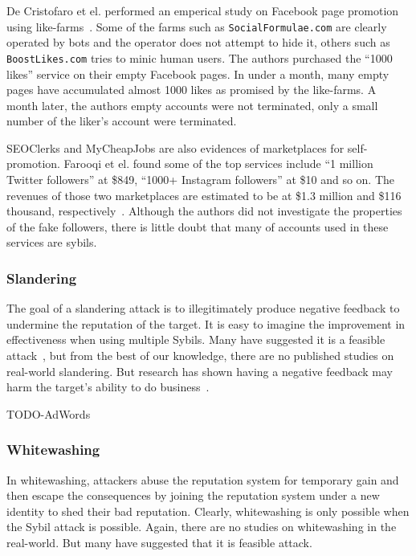 De Cristofaro et el. performed an emperical study on Facebook page promotion
using like-farms~\cite{de2014paying}. Some of the farms such as
\verb!SocialFormulae.com! are clearly operated by bots and the operator does not
attempt to hide it, others such as \verb!BoostLikes.com! tries to minic human
users. The authors purchased the ``1000 likes'' service on their empty Facebook
pages. In under a month, many empty pages have accumulated almost 1000 likes as
promised by the like-farms. A month later, the authors empty accounts were not
terminated, only a small number of the liker's account were terminated.


SEOClerks and MyCheapJobs are also evidences of marketplaces for self-promotion.
Farooqi et el. found some of the top services include ``1 million Twitter
followers'' at \$849, ``1000+ Instagram followers'' at \$10 and so on. The
revenues of those two marketplaces are estimated to be at \$1.3 million and
\$116 thousand, respectively~\cite{farooqi2015characterizing}. Although the
authors did not investigate the properties of the fake followers, there is
little doubt that many of accounts used in these services are sybils.

\subsubsection{Slandering}
The goal of a slandering attack is to illegitimately produce negative feedback
to undermine the reputation of the target. It is easy to imagine the improvement
in effectiveness when using multiple Sybils. Many have suggested it is a
feasible attack~\cite{hoffman2009survey, koutrouli2012taxonomy}, but from the
best of our knowledge, there are no published studies on real-world slandering.
But research has shown having a negative feedback may harm the target's ability
to do business~\cite{ba2002evidence}.

TODO-AdWords

\subsubsection{Whitewashing}
In whitewashing, attackers abuse the reputation system for temporary gain and
then escape the consequences by joining the reputation system under a new
identity to shed their bad reputation. Clearly, whitewashing is only possible
when the Sybil attack is possible. Again, there are no studies on whitewashing
in the real-world. But many have suggested that it is feasible
attack\cite{hoffman2009survey, marti2006taxonomy}.

